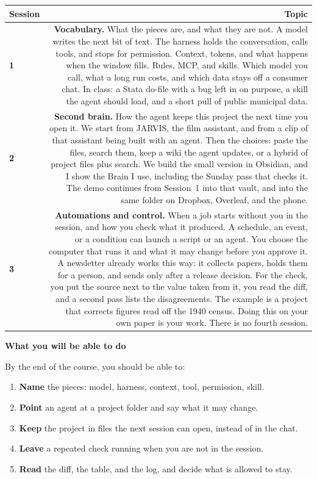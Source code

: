 \documentclass[10pt]{article}
\begin{document}
\begin{tabularx}{\linewidth}{@{}L R@{}}
\toprule
\textbf{Session} & \textbf{Topic} \\
\midrule
\textbf{1} &
\textbf{Vocabulary.} What the pieces are, and what they are not. A model writes the
next bit of text. The harness holds the conversation, calls tools, and stops for
permission. Context, tokens, and what happens when the window fills. Rules, MCP, and
skills. Which model you call, what a long run costs, and which data stays off a
consumer chat. In class: a Stata do-file with a bug left in on purpose, a skill the
agent should load, and a short pull of public municipal data. \\
\addlinespace
\textbf{2} &
\textbf{Second brain.} How the agent keeps this project the next time you open it.
We start from JARVIS, the film assistant, and from a clip of that assistant being
built with an agent. Then the choices: paste the files, search them, keep a wiki the
agent updates, or a hybrid of project files plus search. We build the small version
in Obsidian, and I show the Brain I use, including the Sunday pass that checks it.
The demo continues from Session~1 into that vault, and into the same folder on
Dropbox, Overleaf, and the phone. \\
\addlinespace
\textbf{3} &
\textbf{Automations and control.} When a job starts without you in the session, and
how you check what it produced. A schedule, an event, or a condition can launch a
script or an agent. You choose the computer that runs it and what it may change
before you approve it. A newsletter already works this way: it collects papers,
holds them for a person, and sends only after a release decision. For the check,
you put the source next to the value taken from it, you read the diff, and a second
pass lists the disagreements. The example is a project that corrects figures read
off the 1940 census. Doing this on your own paper is your work. There is no fourth
session. \\
\bottomrule
\end{tabularx}

\vspace{0.2em}

\textbf{\color{deepblue}What you will be able to do}

By the end of the course, you should be able to:
\begin{enumerate}\setlength\itemsep{0.15em}
  \item \textbf{Name} the pieces: model, harness, context, tool, permission, skill.
  \item \textbf{Point} an agent at a project folder and say what it may change.
  \item \textbf{Keep} the project in files the next session can open, instead of in the chat.
  \item \textbf{Leave} a repeated check running when you are not in the session.
  \item \textbf{Read} the diff, the table, and the log, and decide what is allowed to stay.
\end{enumerate}
\end{document}
